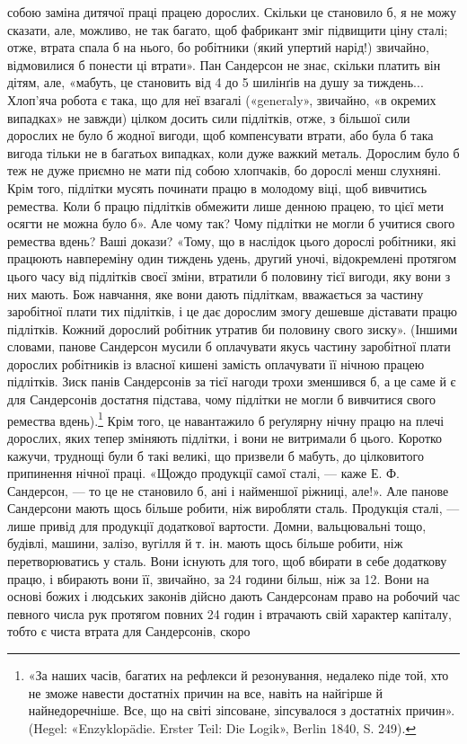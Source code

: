 \parcont{}  %
собою заміна дитячої праці працею дорослих. Скільки це становило
б, я не можу сказати, але, можливо, не так багато, щоб фабрикант
зміг підвищити ціну сталі; отже, втрата спала б на нього,
бо робітники (який упертий нарід!) звичайно, відмовилися б
понести ці втрати». Пан Сандерсон не знає, скільки платить він
дітям, але, «мабуть, це становить від 4 до 5 шилінґів на душу за
тиждень... Хлоп’яча робота є така, що для неї взагалі («generaly»,
звичайно, «в окремих випадках» не завжди) цілком досить
сили підлітків, отже, з більшої сили дорослих не було б жодної
вигоди, щоб компенсувати втрати, або була б така вигода тільки
не в багатьох випадках, коли дуже важкий металь. Дорослим
було б теж не дуже приємно не мати під собою хлопчаків, бо дорослі
менш слухняні. Крім того, підлітки мусять починати працю
в молодому віці, щоб вивчитись ремества. Коли б працю підлітків
обмежити лише денною працею, то цієї мети осягти не можна
було б». Але чому так? Чому підлітки не могли б учитися свого
ремества вдень? Ваші докази? «Тому, що в наслідок цього дорослі
робітники, які працюють навпереміну один тиждень удень,
другий уночі, відокремлені протягом цього часу від підлітків
своєї зміни, втратили б половину тієї вигоди, яку вони з них
мають. Бож навчання, яке вони дають підліткам, вважається за
частину заробітної плати тих підлітків, і це дає дорослим змогу
дешевше діставати працю підлітків. Кожний дорослий робітник
утратив би половину свого зиску». (Іншими словами, панове
Сандерсон мусили б оплачувати якусь частину заробітної плати
дорослих робітників із власної кишені замість оплачувати її
нічною працею підлітків. Зиск панів Сандерсонів за тієї нагоди
трохи зменшився б, а це саме й є для Сандерсонів достатня підстава,
чому підлітки не могли б вивчитися свого ремества вдень).\footnote{
«За наших часів, багатих на рефлекси й резонування, недалеко
піде той, хто не зможе навести достатніх причин на все, навіть на найгірше
й найнедоречніше. Все, що на світі зіпсоване, зіпсувалося з достатніх
причин». (Hegel: «Enzyklopädie. Erster Teil: Die Logik», Berlin
1840, S. 249).
}
Крім того, це навантажило б реґулярну нічну працю на плечі
дорослих, яких тепер зміняють підлітки, і вони не витримали б
цього. Коротко кажучи, труднощі були б такі великі, що призвели б
мабуть, до цілковитого припинення нічної праці. «Щождо продукції
самої сталі, — каже Е. Ф. Сандерсон, — то це не становило б,
ані і найменшої ріжниці, але!». Але панове Сандерсони мають
щось більше робити, ніж виробляти сталь. Продукція сталі, —
лише привід для продукції додаткової вартости. Домни, вальцювальні
тощо, будівлі, машини, залізо, вугілля й т. ін. мають
щось більше робити, ніж перетворюватись у сталь. Вони існують
для того, щоб вбирати в себе додаткову працю, і вбирають вони
її, звичайно, за 24 години більш, ніж за 12. Вони на основі божих
і людських законів дійсно дають Сандерсонам право на робочий
час певного числа рук протягом повних 24 годин і втрачають свій
характер капіталу, тобто є чиста втрата для Сандерсонів, скоро
\parbreak{}  %
